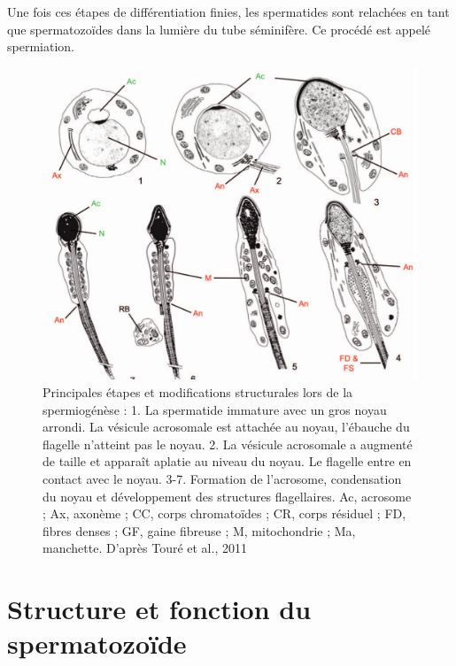\documentclass[12pt,twoside]{reedthesis}
\theoremstyle{definition}
\theoremstyle{definition}
\theoremstyle{remark}
\begin{document}
  Une fois ces étapes de différentiation finies, les spermatides sont
  relachées en tant que spermatozoïdes dans la lumière du tube séminifère.
  Ce procédé est appelé spermiation.
  
  \begin{figure}
  
  {\centering \includegraphics[scale=0.3]{figure/spermiogenese} 
  
  }
  
  \caption[Principales étapes et modifications structurales lors de la spermiogénèse]{Principales étapes et modifications structurales lors de la spermiogénèse : 1. La spermatide immature avec un gros noyau arrondi. La vésicule acrosomale est attachée au noyau, l’ébauche du flagelle n’atteint pas le noyau. 2. La vésicule acrosomale a augmenté de taille et apparaît aplatie au niveau du noyau. Le flagelle entre en contact avec le noyau. 3-7. Formation de l’acrosome, condensation du noyau et développement des structures flagellaires. Ac, acrosome ; Ax, axonème ; CC, corps chromatoïdes ; CR, corps résiduel ; FD, fibres denses ; GF, gaine fibreuse ; M, mitochondrie ; Ma, manchette. D’après Touré et al., 2011}\label{fig:spermiogenese}
  \end{figure}
  
  \section{Structure et fonction du
  spermatozoïde}\label{structure-et-fonction-du-spermatozoide}
  
\end{document}
